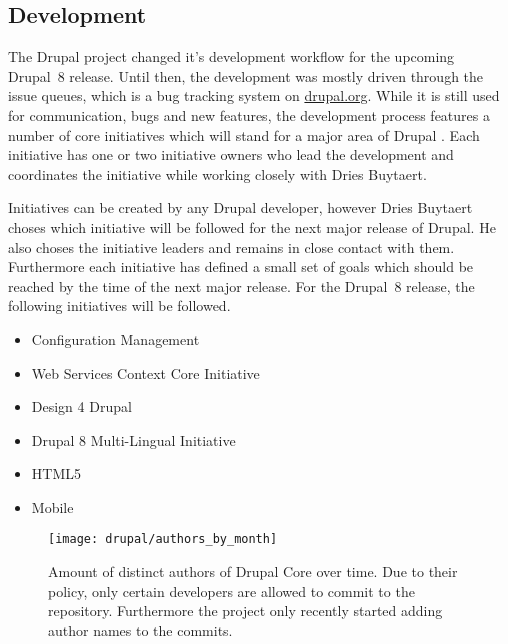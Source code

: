 
\subsection{Development} %

The Drupal project changed it's development workflow for the upcoming Drupal~8
release. Until then, the development was mostly driven through the issue
queues, which is a bug tracking system on \url{drupal.org}. While it is still
used for communication, bugs and new features, the development process features
a number of core initiatives which will stand for a major area of Drupal
\cite{DrupalInitiatives}. Each initiative has one or two initiative owners who
lead the development and coordinates the initiative while working closely with
Dries Buytaert.

Initiatives can be created by any Drupal developer, however Dries Buytaert
choses which initiative will be followed for the next major release of Drupal.
He also choses the initiative leaders and remains in close contact with them.
Furthermore each initiative has defined a small set of goals which should be
reached by the time of the next major release. For the Drupal~8 release, the
following initiatives will be followed.

\begin{itemize}
  \item Configuration Management
  \item Web Services Context Core Initiative
  \item Design 4 Drupal
  \item Drupal 8 Multi-Lingual Initiative
  \item HTML5
  \item Mobile
\end{itemize}

\begin{figure}[htbp]
  \centering
  \texttt{[image: drupal/authors\_by\_month]}
  \caption[Authors by month, Drupal]
  {Amount of distinct authors of Drupal Core over time. Due to their
  policy, only certain developers are allowed to commit to the repository.
  Furthermore the project only recently started adding author names to the
  commits.}
\end{figure}


